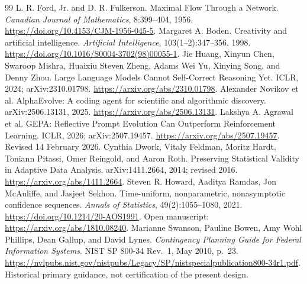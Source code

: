 \documentclass[11pt,a4paper]{article}
\begin{document}
\begin{thebibliography}{99}
 L. R. Ford, Jr. and D. R. Fulkerson. Maximal Flow Through a Network. \emph{Canadian Journal of Mathematics}, 8:399--404, 1956. \url{https://doi.org/10.4153/CJM-1956-045-5}.
 Margaret A. Boden. Creativity and artificial intelligence. \emph{Artificial Intelligence}, 103(1--2):347--356, 1998. \url{https://doi.org/10.1016/S0004-3702(98)00055-1}.
 Jie Huang, Xinyun Chen, Swaroop Mishra, Huaixiu Steven Zheng, Adams Wei Yu, Xinying Song, and Denny Zhou. Large Language Models Cannot Self-Correct Reasoning Yet. ICLR, 2024; arXiv:2310.01798. \url{https://arxiv.org/abs/2310.01798}.
 Alexander Novikov et al. AlphaEvolve: A coding agent for scientific and algorithmic discovery. arXiv:2506.13131, 2025. \url{https://arxiv.org/abs/2506.13131}.
 Lakshya A. Agrawal et al. GEPA: Reflective Prompt Evolution Can Outperform Reinforcement Learning. ICLR, 2026; arXiv:2507.19457. \url{https://arxiv.org/abs/2507.19457}. Revised 14 February 2026.
 Cynthia Dwork, Vitaly Feldman, Moritz Hardt, Toniann Pitassi, Omer Reingold, and Aaron Roth. Preserving Statistical Validity in Adaptive Data Analysis. arXiv:1411.2664, 2014; revised 2016. \url{https://arxiv.org/abs/1411.2664}.
 Steven R. Howard, Aaditya Ramdas, Jon McAuliffe, and Jasjeet Sekhon. Time-uniform, nonparametric, nonasymptotic confidence sequences. \emph{Annals of Statistics}, 49(2):1055--1080, 2021. \url{https://doi.org/10.1214/20-AOS1991}. Open manuscript: \url{https://arxiv.org/abs/1810.08240}.
 Marianne Swanson, Pauline Bowen, Amy Wohl Phillips, Dean Gallup, and David Lynes. \emph{Contingency Planning Guide for Federal Information Systems}. NIST SP 800-34 Rev.~1, May 2010, p.~23. \url{https://nvlpubs.nist.gov/nistpubs/Legacy/SP/nistspecialpublication800-34r1.pdf}. Historical primary guidance, not certification of the present design.
\end{thebibliography}
\end{document}
